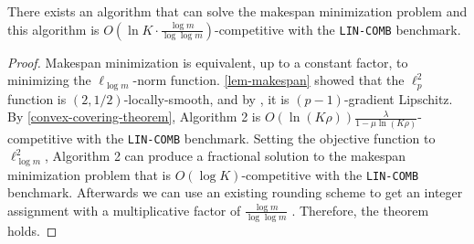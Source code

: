 \begin{theorem}
There exists an algorithm that can solve the makespan minimization problem and this algorithm is \break $O(\ln K \cdot \frac{\log m}{ \log \log m})$-competitive with the \texttt{LIN-COMB} benchmark.
\end{theorem}
%
\begin{proof}
    Makespan minimization is equivalent, up to a constant factor, to minimizing the $\ell_{\log m}$-norm function. \cref{lem-makespan} showed that the $\ell_{p}^{2}$ function is $(2,1/2)$-locally-smooth, and by \cite{CombettesPokutta21:RevisitingTheApproximateCaratheodoryProblem}, it is $(p-1)$-gradient Lipschitz.
    By \cref{convex-covering-theorem}, Algorithm 2 is $O(\ln(K \rho)) \frac{\lambda}{1 - \mu \ln (K\rho)}$-competitive with the \texttt{LIN-COMB} benchmark. Setting the objective function to $\ell_{\log m}^{2}$, Algorithm 2 can produce a fractional solution to the makespan minimization problem that is $O(\log K)$-competitive with the \texttt{LIN-COMB} benchmark.
    Afterwards we can use an existing rounding scheme to get an integer assignment with a multiplicative factor of $\frac{\log m}{ \log \log m}$ \cite{ShiJiayi21:OnlineUnrelatedMachineLoadBalancing}. Therefore, the theorem holds.
\end{proof}
